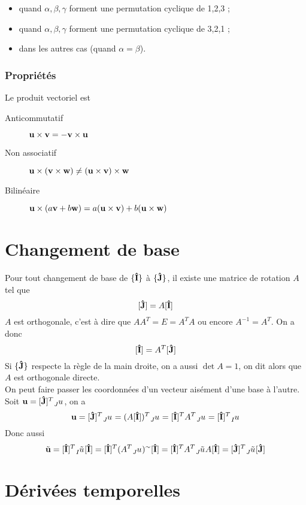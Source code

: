 \begin{itemize}
	\item {} quand $\alpha, \beta, \gamma$ forment une permutation cyclique de 1,2,3 ;
	\item {} quand $\alpha, \beta, \gamma$ forment une permutation cyclique de 3,2,1 ;
	\item {} dans les autres cas (quand $\alpha = \beta$).
\end{itemize}

\subsubsection{Propriétés}
Le produit vectoriel est
\begin{description}
  \item[Anticommutatif] ${\bf u} \times {\bf v} = - {\bf v} \times {\bf u}$
  \item[Non associatif] ${\bf u} \times ({\bf v} \times {\bf w}) \neq ({\bf u} \times {\bf v}) \times {\bf w}$
  \item[Bilinéaire] ${\bf u} \times (a{\bf v} + b{\bf w}) = a ({\bf u} \times {\bf v}) + b ({\bf u} \times {\bf w})$
\end{description}

\section{Changement de base}
Pour tout changement de base de $\{{\bf\hat{I}}\}$ à $\{{\bf\hat{J}}\}$, il existe une matrice de rotation $A$ tel que
\[ [{\bf\hat{J}}] = A [{\bf\hat{I}}] \]
$A$ est orthogonale, c'est à dire que $AA^T = E = A^TA$ ou encore $A^{-1} = A^T$.
On a donc
\[ [{\bf\hat{I}}] = A^T [{\bf\hat{J}}] \]
Si $\{{\bf\hat{J}}\}$ respecte la règle de la main droite, on a aussi $\det A = 1$, on dit alors que $A$ est orthogonale directe.\\
On peut faire passer les coordonnées d'un vecteur aisément d'une base à l'autre.
Soit $\fv{u} = [\uj]^T \wrt{J}{u}$, on a
\[ \fv{u} = [\uj]^T \wrt{J}{u} = (A[\ui])^T \wrt{J}{u} = [\ui]^TA^T \wrt{J}{u} = [\ui]^T \wrt{I}{u}\]
Donc aussi
\[ \tilde{\fv{u}} = [\ui]^T \wrt{I}{\tilde{u}}[\ui] = [\ui]^T (A^T \wrt{J}{u})^{\sim}[\ui] = [\ui]^T A^T \wrt{J}{\tilde{u}} A[\ui] = [\uj]^T \wrt{J}{\tilde{u}} [\uj]\]


\section{Dérivées temporelles}

